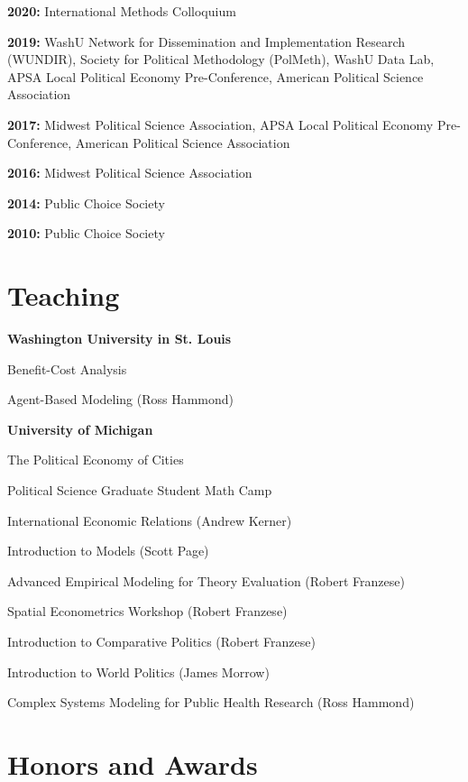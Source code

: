 \documentclass[margin,line]{res}
\newenvironment{list1}{
  \begin{list}{}{%
      \setlength{\itemsep}{0.1in}
      \setlength{\parsep}{0in} \setlength{\parskip}{0in}
      \setlength{\topsep}{0.1in} \setlength{\partopsep}{0in} 
      \setlength{\leftmargin}{0.17in}}}{\end{list}}
\begin{document}
\begin{resume}
\textbf{2020:} International Methods Colloquium 

\textbf{2019:} WashU Network for Dissemination and Implementation Research (WUNDIR), Society for Political Methodology (PolMeth), WashU Data Lab, APSA Local Political Economy Pre-Conference, American Political Science Association

\textbf{2017:} Midwest Political Science Association, APSA Local Political Economy Pre-Conference, American Political Science Association

\textbf{2016:} Midwest Political Science Association

\textbf{2014:} Public Choice Society

\textbf{2010:} Public Choice Society


\section{\sc Teaching}

\textbf{Washington University in St. Louis}
\begin{list1}
	\item[] Benefit-Cost Analysis
	\item[] Agent-Based Modeling (Ross Hammond)
\end{list1}

\textbf{University of Michigan}
\begin{list1}
	\item[] The Political Economy of Cities
	\item[] Political Science Graduate Student Math Camp
	\item International Economic Relations (Andrew Kerner)
	\item Introduction to Models (Scott Page)
	\item Advanced Empirical Modeling for Theory Evaluation (Robert Franzese)
	\item Spatial Econometrics Workshop (Robert Franzese)
	\item Introduction to Comparative Politics (Robert Franzese)
	\item Introduction to World Politics (James Morrow)
	\item Complex Systems Modeling for Public Health Research (Ross Hammond)
\end{list1}



\section{\sc Honors and Awards} 


\end{resume}
\end{document}
